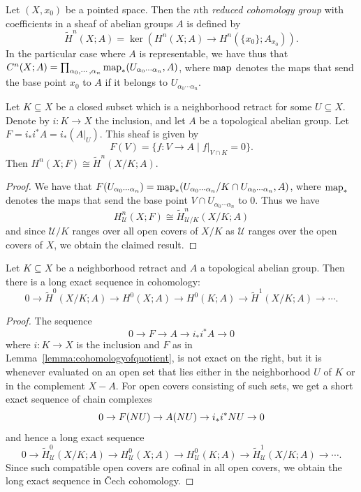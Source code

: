 \documentclass[a4paper,openany]{scrbook}
\newcommand{\nerve}{\mathcal N}
\begin{document}
\begin{defn}
Let $(X,x_0)$ be a pointed space. Then the $n$th \emph{reduced cohomology group} with coefficients in a sheaf of abelian groups $A$ is defined by
\[
\tilde H^n(X;A) = \ker(H^n(X;A) \to H^n(\{x_0\};A_{x_0})).
\]
In the particular case where $A$ is representable, we have thus that $C^n(X;A) = \prod_{\alpha_0,\cdots,\alpha_n} \operatorname{map}_*(U_{\alpha_0\cdots\alpha_n},A)$, where $\operatorname{map}$ denotes the maps that send the base point $x_0$ to $A$ if it belongs to $U_{\alpha_0\cdots\alpha_n}$.
\end{defn}

\begin{lemma}\label{lemma:cohomologyofquotient}
Let $K \subseteq X$ be a closed subset which is a neighborhood retract for some $U \subseteq X$. Denote by $i\colon K \to X$ the inclusion, and let $A$ be a topological abelian group. Let $F = i_*i^*A = i_*(A|_U)$. This sheaf is given by
\[
F(V) = \{f\colon V \to A \mid f|_{V \cap K} = 0\}.
\]
Then $H^n(X;F) \cong \tilde H^n(X/K;A)$.
\end{lemma}
\begin{proof}
We have that $F(U_{\alpha_0\cdots\alpha_n}) = \operatorname{map}_*(U_{\alpha_0\cdots\alpha_n}/K \cap U_{\alpha_0\cdots\alpha_n},A)$, where $\operatorname{map}_*$ denotes the maps that send the base point $V \cap U_{\alpha_0\cdots\alpha_n}$ to $0$. Thus we have
\[
H^n_{\mathcal U}(X;F) \cong \tilde H^n_{\mathcal U/K}(X/K;A)
\]
and since $\mathcal U/K$ ranges over all open covers of $X/K$ as $\mathcal U$ ranges over the open covers of $X$, we obtain the claimed result.
\end{proof}

\begin{corollary}\label{cor:sesforspaces}
Let $K \subseteq X$ be a neighborhood retract and $A$ a topological abelian group. Then there is a long exact sequence in cohomology:
\[
0 \to \tilde H^0(X/K;A) \to H^0(X;A) \to H^0(K;A) \to \tilde H^1(X/K;A) \to \cdots.
\]
\end{corollary}
\begin{proof}
The sequence
\[
0 \to F \to A \to i_*i^*A \to 0
\]
where $i \colon K \to X$ is the inclusion and $F$ as in Lemma~\ref{lemma:cohomologyofquotient}, is not exact on the right, but it is whenever evaluated on an open set that lies either in the neighborhood $U$ of $K$ or in the complement $X-A$. For open covers consisting of such sets, we get a short exact sequence of chain complexes
\[
0 \to F(\mathcal \nerve U) \to A(\mathcal \nerve U) \to i_*i^*\mathcal \nerve U \to 0
\]
and hence a long exact sequence
\[
0 \to \tilde H^0_{\mathcal U}(X/K;A) \to H^0_{\mathcal U}(X;A) \to H^0_{\mathcal U}(K;A) \to \tilde H^1_{\mathcal U}(X/K;A) \to \cdots.
\]
Since such compatible open covers are cofinal in all open covers, we obtain the long exact sequence in \v Cech cohomology.
\end{proof}
\end{document}
